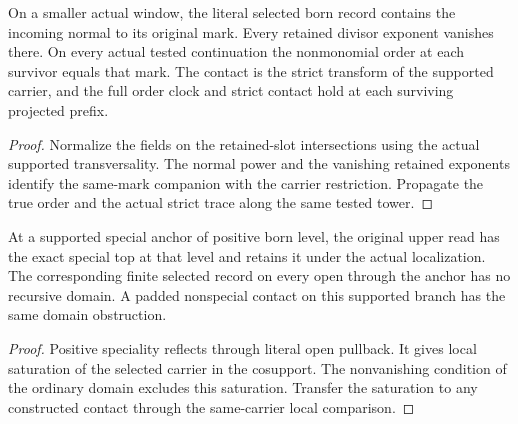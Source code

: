 \begin{theorem}
\label{hir:g1-localized-born-order-and-trace}
\leanok
On a smaller actual window, the literal selected born
record contains the incoming normal to its original
mark. Every retained divisor exponent vanishes there.
On every actual tested continuation the nonmonomial
order at each survivor equals that mark. The contact
is the strict transform of the supported carrier, and
the full order clock and strict contact hold at each
surviving projected prefix.
\end{theorem}
\begin{proof}
Normalize the fields on the retained-slot intersections
using the actual supported transversality. The normal
power and the vanishing retained exponents identify the
same-mark companion with the carrier restriction.
Propagate the true order and the actual strict trace
along the same tested tower.
\end{proof}

\begin{theorem}
\label{hir:g1-localized-next-born-supported-special}
\leanok
At a supported special anchor of positive born level,
the original upper read has the exact special top at
that level and retains it under the actual localization.
The corresponding finite selected record on every open
through the anchor has no recursive domain. A padded
nonspecial contact on this supported branch has the
same domain obstruction.
\end{theorem}
\begin{proof}
Positive speciality reflects through literal open
pullback. It gives local saturation of the selected
carrier in the cosupport. The nonvanishing condition
of the ordinary domain excludes this saturation.
Transfer the saturation to any constructed contact
through the same-carrier local comparison.
\end{proof}

